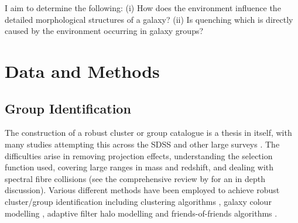 I aim to determine the following: (i) How does the environment influence the detailed morphological structures of a galaxy?  (ii) Is quenching which is directly caused by the environment occurring in galaxy groups?
 
 
 
\section{Data and Methods}\label{sec:data}

\subsection{Group Identification}\label{sec:groups}

The construction of a robust cluster or group catalogue is a thesis in itself, with many studies attempting this across the SDSS \citep{merchan05, miller05, berlind06, yang07, tago08, tago10, tinker11, munoz12, tempel14} and other large surveys \citep{tucker00, merchan02, eke04, cucciati10, robotham11, knobel12}. The difficulties arise in removing projection effects, understanding the selection function used, covering large ranges in mass and redshift, and dealing with spectral fibre collisions (see the comprehensive review by \citet{postman02} for an in depth discussion). Various different methods have been employed to achieve robust cluster/group identification including clustering algorithms \citep[e.g.][]{miller05}, galaxy colour modelling \citep{koester07}, adaptive filter halo modelling \citep{yang05, yang07} and friends-of-friends algorithms \citep{goto05, merchan05, berlind06}. 

